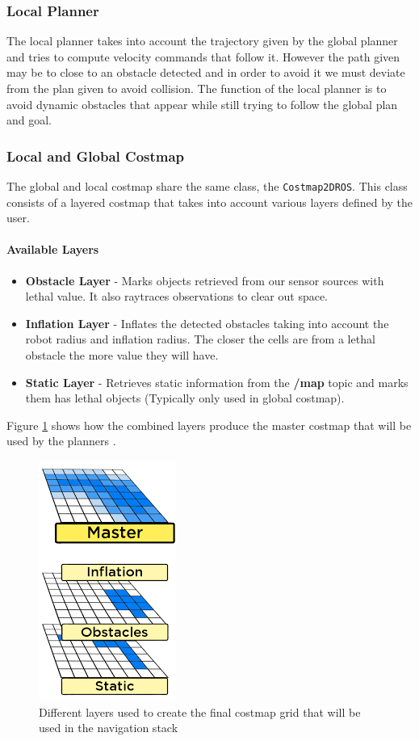 \documentclass[12pt]{article}
\begin{document}
\subsubsection{Local Planner}
The local planner takes into account the trajectory given by the global planner and tries to compute velocity commands that follow it. However the path given may be to close to an obstacle detected and in order to avoid it we must deviate from the plan given to avoid collision. The function of the local planner is to avoid dynamic obstacles that appear while still trying to follow the global plan and goal. 

\subsubsection{Local and Global Costmap}
The global and local costmap share the same class, the  \texttt{Costmap2DROS}. This class consists of a layered costmap that takes into account various layers defined by the user.

\paragraph{Available Layers}
\begin{itemize}[label={}]
    \item \textbf{Obstacle Layer} - Marks objects retrieved from our sensor sources with lethal value. It also raytraces observations to clear out space.
    \item \textbf{Inflation Layer} - Inflates the detected obstacles taking into account the robot radius and inflation radius. The closer the cells are from a lethal obstacle the more value they will have.
    \item \textbf{Static Layer} - Retrieves static information from the \textbf{/map} topic and marks them has lethal objects (Typically only used in global costmap).
\end{itemize}

Figure \ref{fig:layers} shows how the combined layers produce the master costmap that will be used by the planners \cite{dlu}.
\begin{figure}[!htb]
    \centering
    \includegraphics[scale=0.75]{layers.png}
    \caption{Different layers used to create the final costmap grid that will be used in the navigation stack}
    \label{fig:layers}
\end{figure}
\end{document}

